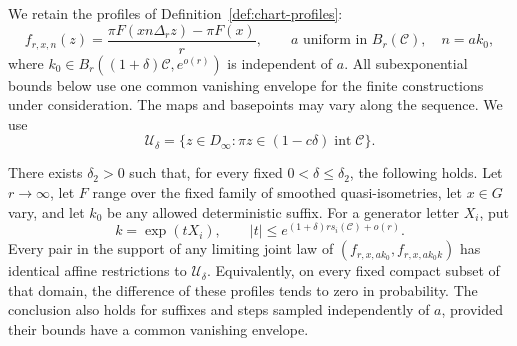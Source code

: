 We retain the profiles of Definition~\ref{def:chart-profiles}:
\[
 f_{r,x,n}(z)=\frac{\pi F(xn\Delta_rz)-\pi F(x)}r,
 \qquad a\text{ uniform in }B_r(\mathcal C),\quad n=ak_0,
\]
where $k_0\in B_r((1+\delta)\mathcal C,e^{o(r)})$ is independent of $a$.
All subexponential bounds below use one common vanishing envelope for the
finite constructions under consideration.  The maps and basepoints may
vary along the sequence.  We use
\[
 \mathcal U_\delta
  =\{z\in D_\infty:\pi z\in(1-c\delta)\operatorname{int}\mathcal C\}.
\]

\begin{proposition}
\label{prop:neighbor-offsets}
There exists $\delta_2>0$ such that, for every fixed
$0<\delta\le\delta_2$, the following holds.  Let $r\to\infty$, let $F$ range
over the fixed family of smoothed quasi-isometries, let $x\in G$ vary, and
let $k_0$ be any allowed deterministic suffix.  For a generator letter
$X_i$, put
\[
 k=\exp(tX_i),\qquad |t|\le e^{(1+\delta)r s_i(\mathcal C)+o(r)}.
\]
Every pair in the support of any limiting joint law of
$(f_{r,x,ak_0},f_{r,x,ak_0k})$ has identical affine restrictions to
$\mathcal U_\delta$.  Equivalently, on every fixed compact subset of that
domain, the difference of these profiles tends to zero in probability.
The conclusion also holds for suffixes and steps sampled independently of
$a$, provided their bounds have a common vanishing envelope.
\end{proposition}

